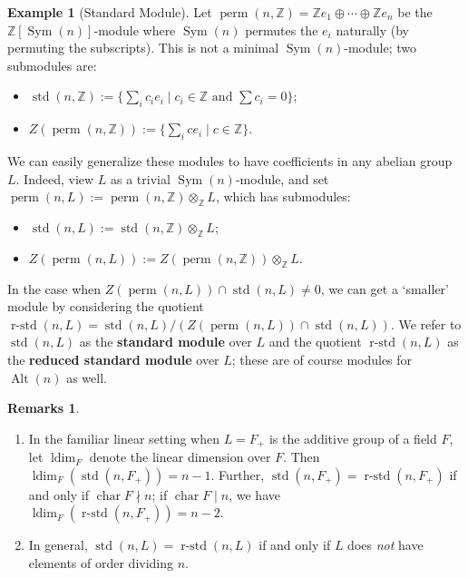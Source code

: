 \documentclass[a4paper, 11pt]{amsart}
\theoremstyle{plain}
\theoremstyle{definition}
\newtheorem{example}[theorem]{Example}
\newtheorem{remarks}[theorem]{Remarks}
\theoremstyle{remark}
\DeclareMathOperator{\ldim}{ldim}
\DeclareMathOperator{\charac}{char}
\DeclareMathOperator{\Sym}{Sym}
\DeclareMathOperator{\Alt}{Alt}
\DeclareMathOperator{\std}{std}
\DeclareMathOperator{\rstd}{r-std}
\DeclareMathOperator{\perm}{perm}
\newcommand{\bZ}{\mathbb{Z}}
\begin{document}
\begin{example}[Standard Module]\label{exam.standard}
Let $\perm(n,\bZ) = \bZ e_1\oplus \cdots \oplus \bZ e_n$ be the $\bZ[\Sym(n)]$-module where $\Sym(n)$ permutes the $e_i$ naturally (by permuting the subscripts). This is not a minimal $\Sym(n)$-module; two submodules are:
\begin{itemize}
\item 
$\std(n, \bZ) := \{\sum_i c_i e_i \mid c_i\in \bZ \text{ and } \sum c_i = 0\}$;
\item
$Z(\perm(n, \bZ)) := \{\sum_i ce_i \mid \text{$c\in \bZ$}\}$.%
\end{itemize}

We can easily generalize these modules to have coefficients in any abelian group $L$. Indeed, view $L$ as a trivial $\Sym(n)$-module, and set $\perm(n,L) := \perm(n,\bZ) \otimes_\bZ L$, which has submodules:
\begin{itemize}
\item
$\std(n,L) := \std(n,\bZ) \otimes_\bZ L$;
\item
$Z(\perm(n, L)) := Z(\perm(n, \bZ)) \otimes_\bZ L$.
\end{itemize}

In the case when $Z(\perm(n, L)) \cap \std(n,L) \neq 0$, we can get a `smaller' module by considering the quotient $\rstd(n, L) = \std(n,L)/(Z(\perm(n, L)) \cap \std(n,L))$. We refer to $\std(n,L)$ as the \textbf{standard module} over $L$ and the quotient $\rstd(n, L)$ as the \textbf{reduced standard module} over $L$; these are of course modules for $\Alt(n)$ as well.
\end{example}

\begin{remarks}\hfill
\begin{enumerate}
    \item In the familiar linear setting when $L = F_+$ is the additive group of a field $F$, let $\ldim_F$ denote the linear dimension over $F$. Then $\ldim_F (\std(n,F_+)) = n-1$. Further, $\std(n,F_+)=\rstd(n, F_+)$ if and only if $\charac F \nmid n$; if $\charac F \mid n$, we have $\ldim_F (\rstd(n,F_+)) = n-2$. 
    \item In general, $\std(n,L)=\rstd(n, L)$ if and only if $L$ does \emph{not} have elements of order dividing $n$.
\end{enumerate}   
\end{remarks}
\end{document}
